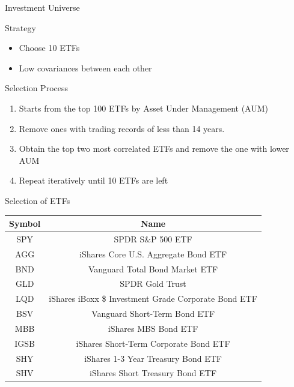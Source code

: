 \begin{frame}{Investment Universe}
\begin{block}{Strategy}
\begin{itemize}
    \item Choose 10 ETFs
    \item Low covariances between each other
\end{itemize}
\end{block}
\begin{block}{Selection Process}
    \begin{enumerate}
    \item Starts from the top 100 ETFs by Asset Under Management (AUM)
    \item Remove ones with trading records of less than 14 years.
    \item \label{itm:remove_items} Obtain the top two most correlated ETFs and remove the one with lower AUM
    \item Repeat \mynum{\ref{itm:remove_items}} iteratively until 10 ETFs are left
    \end{enumerate}
\end{block}
\end{frame}

\begin{frame}{Selection of ETFs}
    \begin{tabular}{|| c | c ||}
    \hline
    Symbol & Name  \\ \hline \hline
    SPY&SPDR S\&P 500 ETF \\ \hline
    AGG&iShares Core U.S. Aggregate Bond ETF \\ \hline
    BND&Vanguard Total Bond Market ETF \\ \hline
    GLD&SPDR Gold Trust \\ \hline
    LQD&iShares iBoxx \$ Investment Grade Corporate Bond ETF \\ \hline
    BSV&Vanguard Short-Term Bond ETF \\ \hline
    MBB&iShares MBS Bond ETF \\ \hline
    IGSB&iShares Short-Term Corporate Bond ETF \\ \hline
    SHY&iShares 1-3 Year Treasury Bond ETF \\ \hline
    SHV&iShares Short Treasury Bond ETF \\ \hline
    \end{tabular}
\end{frame}

